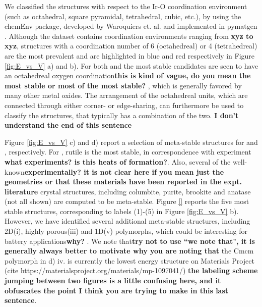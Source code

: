 We classified the structures with respect to the Ir-O coordination environment (such as octahedral, square pyramidal, tetrahedral, cubic, etc.), by using the chemEnv package, developed by Waroquiers et. al. \cite{Waroquiers2017} and implemented in pymatgen \cite{Ong2013}. Although the dataset contains  coordination environments ranging from \textbf{xyz to xyz}, structures with a coordination number of 6 (octahedreal) or 4 (tetrahedreal) are the most prevalent and are highlighted in blue and red respectively in Figure \ref{fig:E_vs_V} a) and b). For both \IrOtwo and \IrOthree the most stable candidates are seen to have an octahedreal oxygen coordination\textbf{this is kind of vague, do you mean the most stable or most of the most stable?} , which is generally favored by many other metal oxides. \cite{Waroquiers2017} The arrangement of the octahedreal units, which are connected through either corner- or edge-sharing, can furthermore be used to classify the structures, that typically has a combination of the two. \textbf{I don't understand the end of this sentence}

Figure \ref{fig:E_vs_V} c) and d) report a selection of meta-stable structures for \IrOtwo and \IrOthree, respectively. For \IrOtwo, rutile is the most stable, in correspondence with experiment \cite{}\textbf{what experiments?  is this  heats of formation?}. Also, several of the well-known\textbf{experimentally?  it is not clear here if you mean just the geometries or that these materials have been reported in the expt. literature} crystal structures, including  columbite, purite, brookite and anatase (not all shown) are computed to be meta-stable.
Figure \ref{} reports the five most stable \IrOthree structures, corresponding to labels (1)-(5) in Figure \ref{fig:E_vs_V} b). However, we have identified several additional meta-stable structures, including 2D(i), highly porous(iii) and 1D(v) polymorphs, which could be interesting for battery applications\textbf{why?} \cite{}. We note that\textbf{try not to use ``we note that", it is generally always better to motivate why you are noting that} the Cmcm polymorph in d) iv. is currently the lowest energy structure on Materials Project (cite https://materialsproject.org/materials/mp-1097041/) \cite{} \textbf{the labeling scheme jumping between two figures is a little confusing here, and it obfuscates the point I think you are trying to make in this last sentence}.




%


